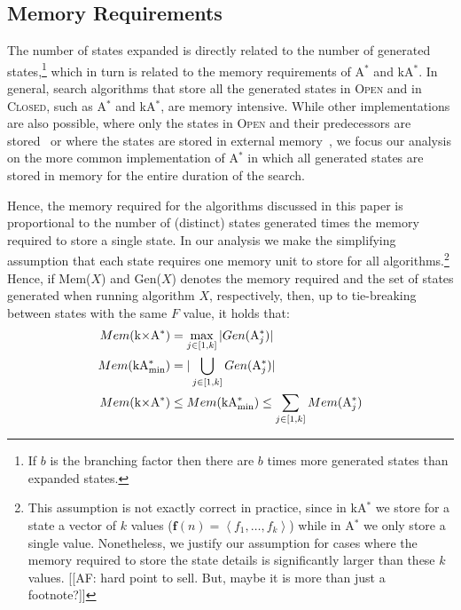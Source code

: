 \documentclass[twoside,11pt]{article}
\newcommand{\astar}{A$^*$\xspace}
\newcommand{\kastar}{kA$^*$\xspace}
\newcommand{\kastarvar}[1]{\textup{kA}$^*_{#1}$\xspace}
\newcommand{\kastarmin}{\kastarvar{\min}}
\newcommand{\kxastar}{k$\times$A$^*$\xspace}
\newcommand{\astari}[1]{A$^*_{#1}$\xspace}
\newcommand{\tuple}[1]{\ensuremath{\left \langle #1 \right \rangle }}
\newcommand{\open}{\textsc{Open}\xspace}
\newcommand{\closed}{\textsc{Closed}\xspace}
\newcommand{\vect}[1]{\mathbf{#1}}
\begin{document}


\subsection{Memory Requirements}
The number of states expanded is directly related to the number of generated states,\footnote{If $b$ is the branching factor then there are $b$ times more generated states than expanded states.} which in turn is related to the memory requirements of \astar and \kastar.
In general, search algorithms that store all the generated states in \open and in \closed, such as \astar and \kastar, are memory intensive.
While other implementations are also possible, where only the states in \open and their predecessors are stored~\cite{zhou2006breadth,korf2004best} or where the states are stored in external memory~\cite{zhou2004structured,edelkamp2016external,edelkamp2005external}, we focus our analysis on the more common implementation of \astar in which all generated states are stored in memory for the entire duration of the search.

Hence, the memory required for the algorithms discussed in this paper is proportional to the number of (distinct) states generated times the memory required to store a single state.
In our analysis we make the simplifying assumption that each state requires one memory unit to store for all algorithms.\footnote{This assumption is not exactly correct in practice, since in \kastar we store for a state a vector of $k$ values ($\vect{f}(n)=\tuple{f_1,\ldots,f_k}$) while in \astar we only store a single value.
Nonetheless, we justify our assumption for cases where the memory required to store the state details is significantly larger than these $k$ values.  [[AF: hard point to sell. But, maybe it is more than just a footnote?]]}
Hence, if Mem($X$) and Gen($X$) denotes the memory required and the set of states generated when running algorithm $X$, respectively, then, up to tie-breaking between states with the same $F$ value, it holds that:
\begin{align}
Mem(\text{\kxastar})&=\max_{j\in [1,k]}| Gen(\text{\astari{j}})| \label{eq:kxastar-mem}\\
Mem(\text{\kastarmin})&=|\bigcup_{j\in [1,k]} Gen(\text{\astari{j}})| \label{eq:kastar-mem}\\
Mem(\text{\kxastar})&\leq Mem(\text{\kastarmin}) \leq \sum_{j\in[1,k]} Mem(\text{\astari{j}}) \label{eq:kxastar-kastar-mem}
\end{align}
\end{document}
